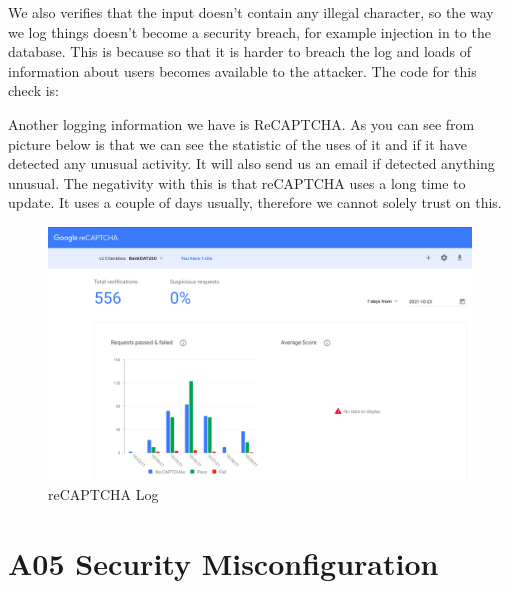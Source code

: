 We also verifies that the input doesn’t contain any illegal character, so the way we log things doesn’t become a security breach, for example injection in to the database. This is because so that it is harder to breach the log and loads of information about users becomes available to the attacker. The code for this check is: 


Another logging information we have is ReCAPTCHA. As you can see from picture below is that we can see the statistic of the uses of it and if it have detected any unusual activity. It will also send us an email if detected anything unusual. The negativity with this is that reCAPTCHA uses a long time to update. It uses a couple of days usually, therefore we cannot solely trust on this. 

\begin{figure}[H]
    \centering
    \includegraphics[width=\textwidth]{pics/recaptchaLog.png}
    \caption{reCAPTCHA Log}
    \label{fig:cha3fig1recaptchalog}
 \end{figure}

\section{A05 Security Misconfiguration}


